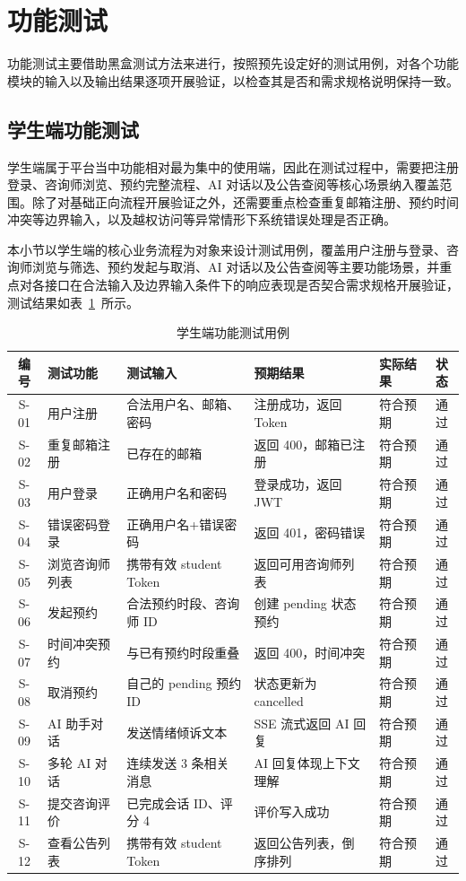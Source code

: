 \section{功能测试}

功能测试主要借助黑盒测试方法来进行，按照预先设定好的测试用例，对各个功能模块的输入以及输出结果逐项开展验证，以检查其是否和需求规格说明保持一致。

\subsection{学生端功能测试}

学生端属于平台当中功能相对最为集中的使用端，因此在测试过程中，需要把注册登录、咨询师浏览、预约完整流程、AI 对话以及公告查阅等核心场景纳入覆盖范围。除了对基础正向流程开展验证之外，还需要重点检查重复邮箱注册、预约时间冲突等边界输入，以及越权访问等异常情形下系统错误处理是否正确。

本小节以学生端的核心业务流程为对象来设计测试用例，覆盖用户注册与登录、咨询师浏览与筛选、预约发起与取消、AI 对话以及公告查阅等主要功能场景，并重点对各接口在合法输入及边界输入条件下的响应表现是否契合需求规格开展验证，测试结果如表~\ref{tab:5-2}~所示。

\begin{table}[H]
    \centering
    \caption{学生端功能测试用例}
    \label{tab:5-2}
    \begin{tabularx}{\linewidth}{clXXXc}
        \toprule
        编号 & 测试功能 & 测试输入 & 预期结果 & 实际结果 & 状态 \\
        \midrule
        S-01 & 用户注册 & 合法用户名、邮箱、密码 & 注册成功，返回 Token & 符合预期 & 通过 \\
        S-02 & 重复邮箱注册 & 已存在的邮箱 & 返回 400，邮箱已注册 & 符合预期 & 通过 \\
        S-03 & 用户登录 & 正确用户名和密码 & 登录成功，返回 JWT & 符合预期 & 通过 \\
        S-04 & 错误密码登录 & 正确用户名+错误密码 & 返回 401，密码错误 & 符合预期 & 通过 \\
        S-05 & 浏览咨询师列表 & 携带有效 student Token & 返回可用咨询师列表 & 符合预期 & 通过 \\
        S-06 & 发起预约 & 合法预约时段、咨询师 ID & 创建 pending 状态预约 & 符合预期 & 通过 \\
        S-07 & 时间冲突预约 & 与已有预约时段重叠 & 返回 400，时间冲突 & 符合预期 & 通过 \\
        S-08 & 取消预约 & 自己的 pending 预约 ID & 状态更新为 cancelled & 符合预期 & 通过 \\
        S-09 & AI 助手对话 & 发送情绪倾诉文本 & SSE 流式返回 AI 回复 & 符合预期 & 通过 \\
        S-10 & 多轮 AI 对话 & 连续发送 3 条相关消息 & AI 回复体现上下文理解 & 符合预期 & 通过 \\
        S-11 & 提交咨询评价 & 已完成会话 ID、评分 4 & 评价写入成功 & 符合预期 & 通过 \\
        S-12 & 查看公告列表 & 携带有效 student Token & 返回公告列表，倒序排列 & 符合预期 & 通过 \\
        \bottomrule
    \end{tabularx}
\end{table}

